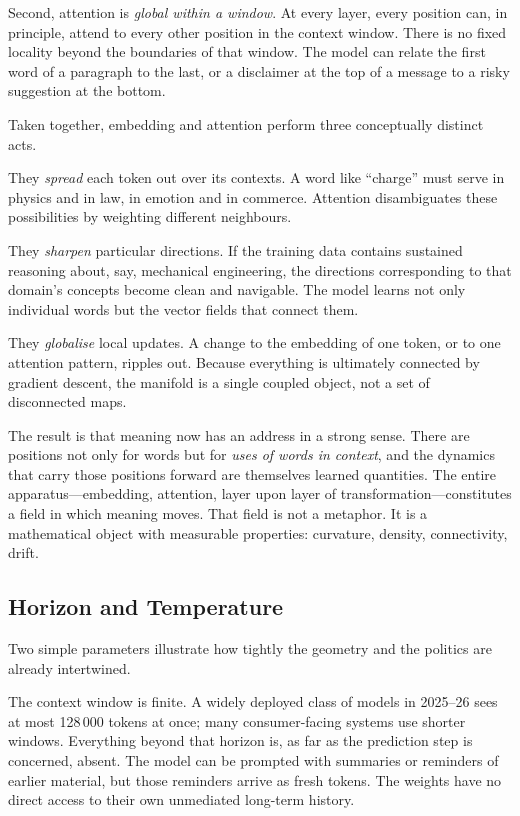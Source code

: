 \documentclass[12pt,a4paper]{report}
\begin{document}
Second, attention is \emph{global within a window}. At every layer, every position can, in principle, attend to every other position in the context window. There is no fixed locality beyond the boundaries of that window. The model can relate the first word of a paragraph to the last, or a disclaimer at the top of a message to a risky suggestion at the bottom.

Taken together, embedding and attention perform three conceptually distinct acts.

They \emph{spread} each token out over its contexts. A word like ``charge'' must serve in physics and in law, in emotion and in commerce. Attention disambiguates these possibilities by weighting different neighbours.

They \emph{sharpen} particular directions. If the training data contains sustained reasoning about, say, mechanical engineering, the directions corresponding to that domain's concepts become clean and navigable. The model learns not only individual words but the vector fields that connect them.

They \emph{globalise} local updates. A change to the embedding of one token, or to one attention pattern, ripples out. Because everything is ultimately connected by gradient descent, the manifold is a single coupled object, not a set of disconnected maps.

The result is that meaning now has an address in a strong sense. There are positions not only for words but for \emph{uses of words in context}, and the dynamics that carry those positions forward are themselves learned quantities. The entire apparatus---embedding, attention, layer upon layer of transformation---constitutes a field in which meaning moves. That field is not a metaphor. It is a mathematical object with measurable properties: curvature, density, connectivity, drift.

\subsection*{Horizon and Temperature}

Two simple parameters illustrate how tightly the geometry and the politics are already intertwined.

The context window is finite. A widely deployed class of models in 2025--26 sees at most 128\,000 tokens at once; many consumer-facing systems use shorter windows. Everything beyond that horizon is, as far as the prediction step is concerned, absent. The model can be prompted with summaries or reminders of earlier material, but those reminders arrive as fresh tokens. The weights have no direct access to their own unmediated long-term history.
\end{document}
